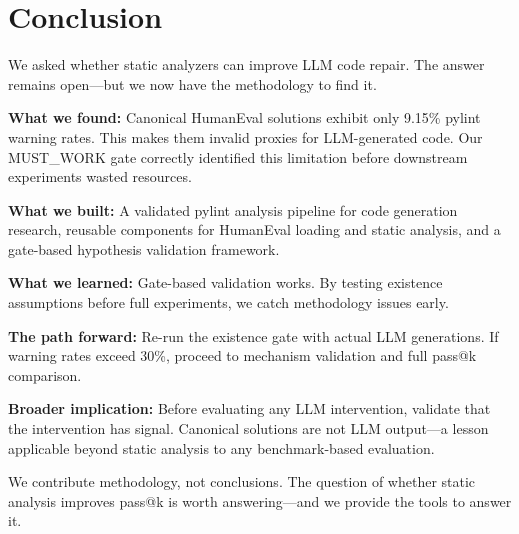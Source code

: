 \section{Conclusion}

We asked whether static analyzers can improve LLM code repair. The answer remains open---but we now have the methodology to find it.

\textbf{What we found:} Canonical HumanEval solutions exhibit only 9.15\% pylint warning rates. This makes them invalid proxies for LLM-generated code. Our MUST\_WORK gate correctly identified this limitation before downstream experiments wasted resources.

\textbf{What we built:} A validated pylint analysis pipeline for code generation research, reusable components for HumanEval loading and static analysis, and a gate-based hypothesis validation framework.

\textbf{What we learned:} Gate-based validation works. By testing existence assumptions before full experiments, we catch methodology issues early.

\textbf{The path forward:} Re-run the existence gate with actual LLM generations. If warning rates exceed 30\%, proceed to mechanism validation and full pass@k comparison.

\textbf{Broader implication:} Before evaluating any LLM intervention, validate that the intervention has signal. Canonical solutions are not LLM output---a lesson applicable beyond static analysis to any benchmark-based evaluation.

We contribute methodology, not conclusions. The question of whether static analysis improves pass@k is worth answering---and we provide the tools to answer it.
